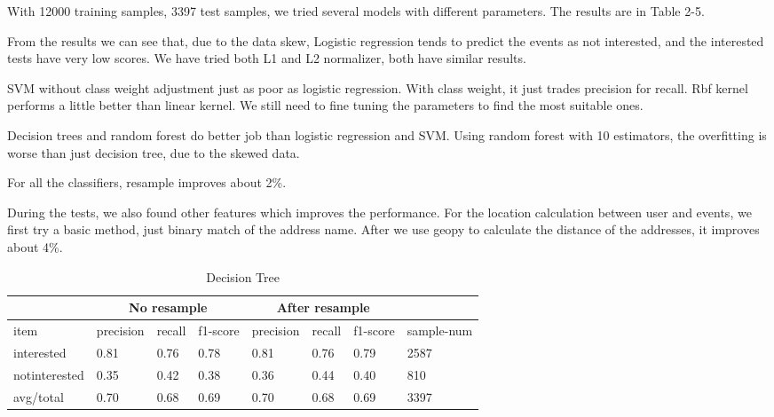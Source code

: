 \documentclass{article} %
\begin{document}
With 12000 training samples, 3397 test samples, we tried several models with different parameters. The results are in Table 2-5.

From the results we can see that, due to the data skew, Logistic regression tends to predict the events as not interested, and the interested tests have very low scores. We have tried both L1 and L2 normalizer, both have similar results.

SVM without class weight adjustment just as poor as logistic regression. With class weight, it just trades precision for recall. Rbf kernel performs a little better than linear kernel. We still need to fine tuning the parameters to find the most suitable ones.
  
Decision trees and random forest do better job than logistic regression and SVM. Using random forest with 10 estimators, the overfitting is worse than just decision tree, due to the skewed data. 

For all the classifiers, resample improves about 2\%.

During the tests, we also found other features which improves the performance. For the location calculation between user and events, we first try a basic method, just binary match of the address name. After we use geopy to calculate the distance of the addresses, it improves about 4\%.


\begin{table}[H]
\caption{Decision Tree}
\label{sample-table}
\begin{center}
\begin{tabular}{|l|l|l|l|l|l|l|l|}
\hline 
\textbf{ } & \multicolumn{3}{|c|}{\textbf{No resample}} & \multicolumn{3}{|c|}{\textbf{After resample}} &\textbf{ } \\ \hline
item	&precision	&recall	&f1-score &precision	&recall	&f1-score 	&sample-num\\ \hline
interested			&0.81      &0.76      &0.78     &0.81      &0.76      &0.79      &2587\\ \hline
notinterested		&0.35      &0.42      &0.38    &0.36      &0.44      &0.40      &810\\ \hline
avg/total			&0.70      &0.68      &0.69    &0.70      &0.68      &0.69      &3397\\ \hline
\end{tabular}
\end{center}
\end{table}
\end{document}
